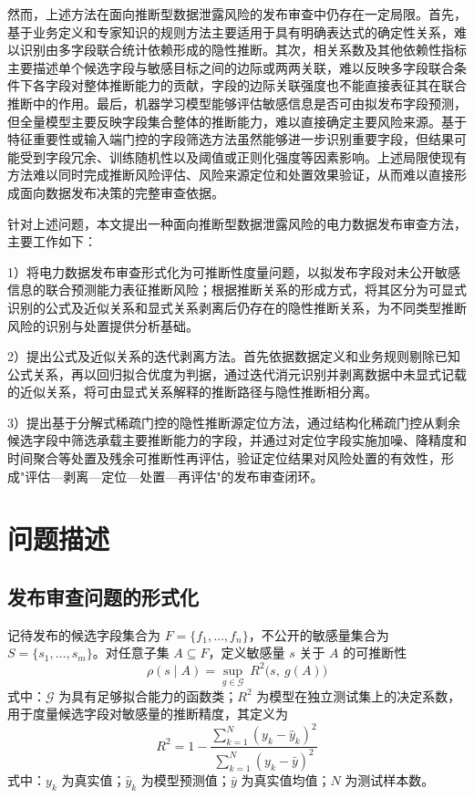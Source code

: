 \documentclass[UTF8,zihao=5,twoside,fontset=none]{ctexart}
\begin{document}
然而，上述方法在面向推断型数据泄露风险的发布审查中仍存在一定局限。首先，基于业务定义和专家知识的规则方法主要适用于具有明确表达式的确定性关系，难以识别由多字段联合统计依赖形成的隐性推断。其次，相关系数及其他依赖性指标主要描述单个候选字段与敏感目标之间的边际或两两关联，难以反映多字段联合条件下各字段对整体推断能力的贡献，字段的边际关联强度也不能直接表征其在联合推断中的作用。最后，机器学习模型能够评估敏感信息是否可由拟发布字段预测，但全量模型主要反映字段集合整体的推断能力，难以直接确定主要风险来源。基于特征重要性或输入端门控的字段筛选方法虽然能够进一步识别重要字段，但结果可能受到字段冗余、训练随机性以及阈值或正则化强度等因素影响。上述局限使现有方法难以同时完成推断风险评估、风险来源定位和处置效果验证，从而难以直接形成面向数据发布决策的完整审查依据。

针对上述问题，本文提出一种面向推断型数据泄露风险的电力数据发布审查方法，主要工作如下：

1）将电力数据发布审查形式化为可推断性度量问题，以拟发布字段对未公开敏感信息的联合预测能力表征推断风险；根据推断关系的形成方式，将其区分为可显式识别的公式及近似关系和显式关系剥离后仍存在的隐性推断关系，为不同类型推断风险的识别与处置提供分析基础。

2）提出公式及近似关系的迭代剥离方法。首先依据数据定义和业务规则剔除已知公式关系，再以回归拟合优度为判据，通过迭代消元识别并剥离数据中未显式记载的近似关系，将可由显式关系解释的推断路径与隐性推断相分离。

3）提出基于分解式稀疏门控的隐性推断源定位方法，通过结构化稀疏门控从剩余候选字段中筛选承载主要推断能力的字段，并通过对定位字段实施加噪、降精度和时间聚合等处置及残余可推断性再评估，验证定位结果对风险处置的有效性，形成"评估—剥离—定位—处置—再评估"的发布审查闭环。

\section{问题描述}

\subsection{发布审查问题的形式化}

记待发布的候选字段集合为 $F=\{f_1,\dots,f_n\}$，不公开的敏感量集合为 $S=\{s_1,\dots,s_m\}$。对任意子集 $A\subseteq F$，定义敏感量 $s$ 关于 $A$ 的可推断性
\begin{equation}
\rho(s\mid A)=\sup_{g\in\mathcal{G}}\ R^2\big(s,\ g(A)\big)
\end{equation}
式中：$\mathcal{G}$ 为具有足够拟合能力的函数类；$R^2$ 为模型在独立测试集上的决定系数，用于度量候选字段对敏感量的推断精度，其定义为
\begin{equation}
R^2=1-\frac{\sum_{k=1}^{N}(y_k-\hat y_k)^2}{\sum_{k=1}^{N}(y_k-\bar y)^2}
\end{equation}
式中：$y_k$ 为真实值；$\hat y_k$ 为模型预测值；$\bar y$ 为真实值均值；$N$ 为测试样本数。
\end{document}
